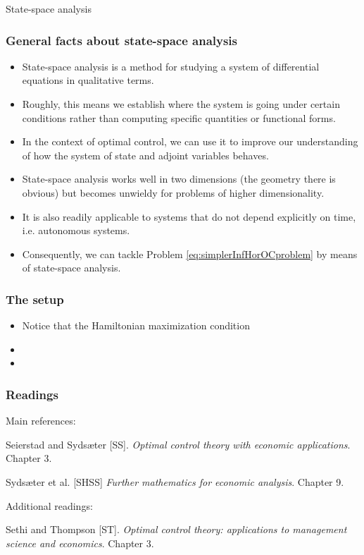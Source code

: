 \documentclass[10pt]{beamer}
\theoremstyle{definition}
\begin{document}
\begin{section}{State-space analysis}\label{sec:sspace}

\begin{frame}[fragile]
\frametitle{General facts about state-space analysis}
\begin{itemize}\itemsep1em
\item State-space analysis is a method for studying a system of differential equations in qualitative terms. 
\item Roughly, this means we establish where the system is going under certain conditions rather than computing specific quantities or functional forms.
\item In the context of optimal control, we can use it to improve our understanding of how the system of state and adjoint variables behaves.
\item State-space analysis works well in two dimensions (the geometry there is obvious) but becomes unwieldy for problems of higher dimensionality.
\item It is also readily applicable to systems that do not depend explicitly on time, i.e. autonomous systems.
\item Consequently, we can tackle Problem \eqref{eq:simplerInfHorOCproblem} by means of state-space analysis.
\end{itemize}
\end{frame}

\begin{frame}[fragile]
\frametitle{The setup}
\begin{itemize}\itemsep1em
\item Notice that the Hamiltonian maximization condition
\item 
\item 
\end{itemize}
\end{frame}




\end{section}

\begin{frame}[fragile]
\frametitle{Readings}
Main references:\bigskip

Seierstad and Syds\ae{}ter [SS]. \emph{Optimal control theory with economic applications}. Chapter 3.

Syds\ae{}ter et al. [SHSS] \emph{Further mathematics for economic analysis}. Chapter 9.\bigskip

Additional readings:

Sethi and Thompson [ST]. \emph{Optimal control theory: applications to management science and economics}. Chapter 3.
\end{frame}
\end{document}
